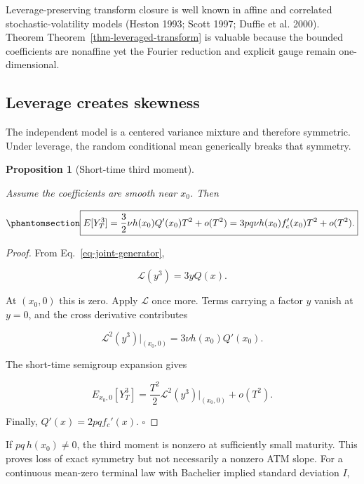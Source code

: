 \documentclass[
  english,
  11pt,
  letterpaper,
  DIV=11,
  numbers=noendperiod]{scrartcl}
\theoremstyle{plain}
\theoremstyle{plain}
\theoremstyle{plain}
\theoremstyle{plain}
\newtheorem{proposition}{Proposition}[section]
\theoremstyle{remark}
\begin{document}
Leverage-preserving transform closure is well known in affine and
correlated stochastic-volatility models (Heston 1993; Scott 1997; Duffie
et al. 2000). Theorem Theorem~\ref{thm-leveraged-transform} is valuable
because the bounded coefficients are nonaffine yet the Fourier reduction
and explicit gauge remain one-dimensional.

\subsection{Leverage creates skewness}\label{leverage-creates-skewness}

The independent model is a centered variance mixture and therefore
symmetric. Under leverage, the random conditional mean generically
breaks that symmetry.

\begin{proposition}[Short-time third
moment]\protect\hypertarget{prp-short-skew}{}\label{prp-short-skew}

Assume the coefficients are smooth near \(x_0\). Then

\begin{equation}\protect\phantomsection\label{eq-third-moment}{
\boxed{
E[Y_T^3]
=\frac32\nu h(x_0)Q'(x_0)T^2+o(T^2)
=3pq\nu h(x_0)f_c'(x_0)T^2+o(T^2).
}
}\end{equation}

\end{proposition}

\begin{proof}
From Eq.~\ref{eq-joint-generator},

\[
\mathcal L(y^3)=3yQ(x).
\]

At \((x_0,0)\) this is zero. Apply \(\mathcal L\) once more. Terms
carrying a factor \(y\) vanish at \(y=0\), and the cross derivative
contributes

\[
\mathcal L^2(y^3)\big|_{(x_0,0)}
=3\nu h(x_0)Q'(x_0).
\]

The short-time semigroup expansion gives

\[
E_{x_0,0}[Y_T^3]
=\frac{T^2}{2}
\mathcal L^2(y^3)\big|_{(x_0,0)}
+o(T^2).
\]

Finally, \(Q'(x)=2pqf_c'(x)\). \(\square\)
\end{proof}

If \(pq\,h(x_0)\ne0\), the third moment is nonzero at sufficiently small
maturity. This proves loss of exact symmetry but not necessarily a
nonzero ATM slope. For a continuous mean-zero terminal law with
Bachelier implied standard deviation \(I\),
\end{document}

